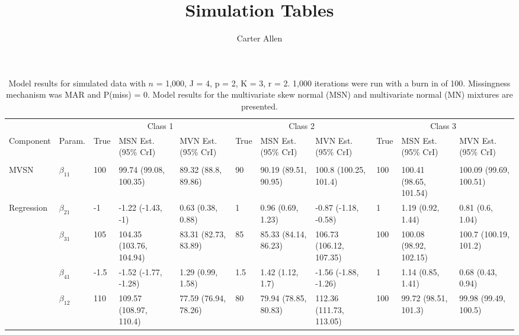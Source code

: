 \documentclass[]{article}
\title{Simulation Tables}
\author{Carter Allen}
\date{}
\begin{document}
\maketitle

\begin{landscape}\begin{table}[t]

\caption{\label{tab:unnamed-chunk-5}Model results for simulated data with $n$ = 1,000, J = 4, p = 2, K = 3, r = 2. 1,000 iterations were run with a burn in of 100. Missingness mechanism was MAR and P(miss) = 0. Model results for the multivariate skew normal (MSN) and multivariate normal (MN) mixtures are presented.}
\centering
\fontsize{7}{9}\selectfont
\begin{tabular}{lllllllllll}
\toprule
\multicolumn{2}{c}{ } & \multicolumn{3}{c}{Class 1} & \multicolumn{3}{c}{Class 2} & \multicolumn{3}{c}{Class 3} \\
\cmidrule(l{3pt}r{3pt}){3-5} \cmidrule(l{3pt}r{3pt}){6-8} \cmidrule(l{3pt}r{3pt}){9-11}
Component & Param. & True & MSN Est. (95\% CrI) & MVN Est. (95\% CrI)  & True & MSN Est. (95\% CrI) & MVN Est. (95\% CrI) & True & MSN Est. (95\% CrI) & MVN Est. (95\% CrI)\\
\midrule
\addlinespace[0.3em]
\multicolumn{11}{l}{\textbf{ }}\\
\hspace{1em}MVSN & $\beta_{11}$ & 100 & 99.74 (99.08, 100.35) & 89.32 (88.8, 89.86) & 90 & 90.19 (89.51, 90.95) & 100.8 (100.25, 101.4) & 100 & 100.41 (98.65, 101.54) & 100.09 (99.69, 100.51)\\
\hspace{1em}Regression & $\beta_{21}$ & -1 & -1.22 (-1.43, -1) & 0.63 (0.38, 0.88) & 1 & 0.96 (0.69, 1.23) & -0.87 (-1.18, -0.58) & 1 & 1.19 (0.92, 1.44) & 0.81 (0.6, 1.04)\\
\hspace{1em} & $\beta_{31}$ & 105 & 104.35 (103.76, 104.94) & 83.31 (82.73, 83.89) & 85 & 85.33 (84.14, 86.23) & 106.73 (106.12, 107.35) & 100 & 100.08 (98.92, 102.15) & 100.7 (100.19, 101.2)\\
\hspace{1em} & $\beta_{41}$ & -1.5 & -1.52 (-1.77, -1.28) & 1.29 (0.99, 1.58) & 1.5 & 1.42 (1.12, 1.7) & -1.56 (-1.88, -1.26) & 1 & 1.14 (0.85, 1.41) & 0.68 (0.43, 0.94)\\
\hspace{1em} & $\beta_{12}$ & 110 & 109.57 (108.97, 110.4) & 77.59 (76.94, 78.26) & 80 & 79.94 (78.85, 80.83) & 112.36 (111.73, 113.05) & 100 & 99.72 (98.51, 101.3) & 99.98 (99.49, 100.5)\\

\end{tabular}
\end{table}
\end{landscape}
\end{document}
